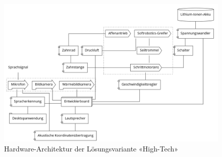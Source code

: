 \documentclass[a4paper,11pt]{scrartcl}
\begin{document}
\begin{figure}[H]
    \includegraphics[width=\linewidth]{hightech.png}
    \caption{Hardware-Architektur der Lösungsvariante «High-Tech»}
    \label{fig:hightech}
\end{figure}
\end{document}
